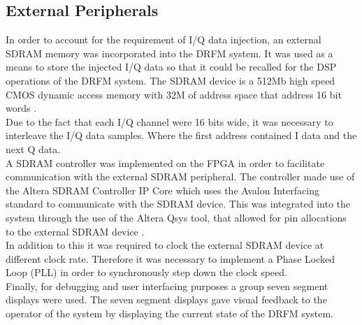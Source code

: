 	\subsection{External Peripherals}
	\noindent In order to account for the requirement of I/Q data injection, an external SDRAM memory was incorporated into the DRFM system. It was used as a means to store the injected I/Q data so that it could be recalled for the DSP operations of the DRFM system. The SDRAM device is a 512Mb high speed CMOS dynamic access memory with 32M of address space that address 16 bit words \cite{SDRAM}. \\ \newline Due to the fact that each I/Q channel were 16 bits wide, it was necessary to interleave the I/Q data samples. Where the first address contained I data and the next Q data. \\ \newline A SDRAM controller was implemented on the FPGA in order to facilitate communication with the external SDRAM peripheral. The controller made use of the Altera SDRAM Controller IP Core which uses the Avalon Interfacing standard to communicate with the SDRAM device. This was integrated into the system through the use of the Altera Qsys tool, that allowed for pin allocations to the external SDRAM device \cite{SDRAM_Core}. \\ \newline In addition to this it was required to clock the external SDRAM device at different clock rate. Therefore it was necessary to implement a Phase Locked Loop (PLL) in order to synchronously  step down the clock speed.\\ \newline Finally, for debugging and user interfacing purposes a group seven segment displays were used. The seven segment displays gave visual feedback to the operator of the system by displaying the current state of the DRFM system.
